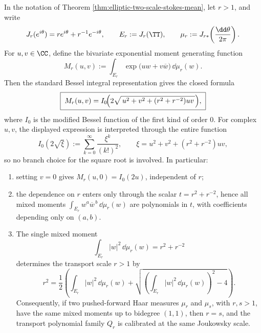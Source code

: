 \begin{proposition}\label{prop:joukowsky-bivariate-mgf-bessel}
In the notation of Theorem \ref{thm:elliptic-two-scale-stokes-mean}, let \(r>1\), and write
\[
J_r(e^{i\theta})=r e^{i\theta}+r^{-1}e^{-i\theta},
\qquad
E_r:=J_r(\TT),
\qquad
\mu_r:=J_{r\ast}\!\left(\frac{\dd\theta}{2\pi}\right).
\]
For \(u,v\in\CC\), define the bivariate exponential moment generating function
\[
M_r(u,v):=\int_{E_r}\exp\bigl(u w+v\overline w\bigr)\,\dd\mu_r(w).
\]
Then the standard Bessel integral representation \citep[Chapter~3]{Watson1944} gives the closed formula
\[
\boxed{\;
M_r(u,v)=I_0\!\Bigl(2\sqrt{\,u^2+v^2+(r^2+r^{-2})uv\,}\Bigr),
  \;}
  \]
where \(I_0\) is the modified Bessel function of the first kind of order \(0\).  For complex \(u,v\), the displayed expression is interpreted through the entire function
\[
I_0(2\sqrt{\xi}):=\sum_{k=0}^{\infty}\frac{\xi^k}{(k!)^2},
\qquad \xi=u^2+v^2+(r^2+r^{-2})uv,
\]
so no branch choice for the square root is involved. In particular:
\begin{enumerate}
  \item setting \(v=0\) gives \(M_r(u,0)=I_0(2u)\), independent of \(r\);
  \item the dependence on \(r\) enters only through the scalar \(t=r^2+r^{-2}\), hence all mixed moments
  \(\int_{E_r} w^a\overline w^{\,b}\,\dd\mu_r(w)\)
  are polynomials in \(t\), with coefficients depending only on \((a,b)\).
  \item The single mixed moment
  \[
  \int_{E_r}|w|^2\,\dd\mu_r(w)=r^2+r^{-2}
  \]
  determines the transport scale \(r>1\) by
  \[
  r^2=\frac{1}{2}\left(\int_{E_r}|w|^2\,\dd\mu_r(w)+
  \sqrt{\left(\int_{E_r}|w|^2\,\dd\mu_r(w)\right)^2-4}\right).
  \]
  Consequently, if two pushed-forward Haar measures \(\mu_r\) and \(\mu_s\), with \(r,s>1\), have the same mixed moments up to bidegree \((1,1)\), then \(r=s\), and the transport polynomial family \(Q_r\) is calibrated at the same Joukowsky scale.
\end{enumerate}
\end{proposition}
